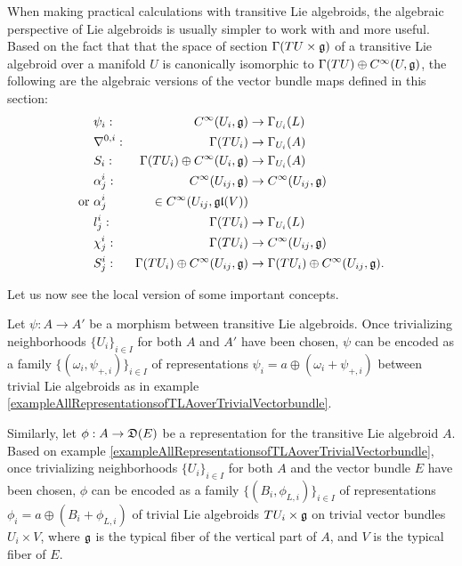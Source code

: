 \lin

When making practical calculations with transitive Lie algebroids, the algebraic perspective of Lie algebroids is usually simpler to work with and more useful. Based on the fact that that the space of section $\Gamma(TU\times \mathfrak{g})$ of a transitive Lie algebroid over a manifold $U$ is canonically isomorphic to $\Gamma(TU) \oplus C^\infty(U, \mathfrak{g})$, the following are the algebraic versions of the vector bundle maps defined in this section:
\begin{align}
    &\psi_i:& C^\infty(U_i, \mathfrak{g}) &\to \Gamma_{U_i}(L)\\
    &\nabla^{0, i}:& \Gamma(TU_i) &\to \Gamma_{U_i}(A)\\
    &S_i:& \Gamma(TU_i)\oplus C^\infty(U_i, \mathfrak{g}) &\to \Gamma_{U_i}(A)\\
    &\alpha^i_j:& C^\infty(U_{ij}, \mathfrak{g}) &\to C^\infty(U_{ij}, \mathfrak{g}) \\
    \text{or   } &\alpha^i_j& \in C^\infty(U_{ij}, \mathfrak{gl}(V)) \\
    &l^i_j:& \Gamma(TU_i) &\to \Gamma_{U_i}(L)\\
    &\chi^i_j:& \Gamma(TU_i) &\to C^\infty(U_{ij}, \mathfrak{g}) \\
    &S^i_j:& \Gamma(TU_i)\oplus C^\infty(U_{ij}, \mathfrak{g}) &\to \Gamma(TU_i)\oplus C^\infty(U_{ij}, \mathfrak{g}).
\end{align}

\linea

Let us now see the local version of some important concepts.

Let $\psi: A \to A'$ be a morphism between transitive Lie algebroids. Once trivializing neighborhoods $\{U_i\}_{i \in I}$ for both $A$ and $A'$ have been chosen, $\psi$ can be encoded as a family $\{(\omega_i, \psi_{+, i})\}_{i\in I}$ of representations $\psi_i = a \oplus (\omega_i + \psi_{+,i})$ between trivial Lie algebroids as in example \ref{exampleAllRepresentationsofTLAoverTrivialVectorbundle}.

\lin

Similarly, let $\phi: A \to \alg D(E)$ be a representation for the transitive Lie algebroid $A$. Based on example \ref{exampleAllRepresentationsofTLAoverTrivialVectorbundle}, once trivializing neighborhoods $\{U_i\}_{i \in I}$ for both $A$ and the vector bundle $E$ have been chosen, $\phi$ can be encoded as a family $\{(B_i, \phi_{L, i})\}_{i\in I}$ of representations $\phi_i = a \oplus (B_i + \phi_{L,i})$ of trivial Lie algebroids $TU_i \times \mathfrak{g}$ on trivial vector bundles $U_i \times V$, where $\mathfrak{g}$ is the typical fiber of the vertical part of $A$, and $V$ is the typical fiber of $E$.


